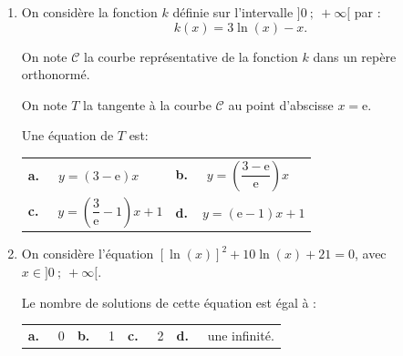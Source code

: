 \documentclass[10pt]{article}
\begin{document}
\begin{enumerate}
\begin{center}
\begin{tabularx}{\linewidth}{*{2}{X}}
en $x = 3,5$.
\end{tabularx}
\end{center}

\item On considère la fonction $k$ définie sur l'intervalle $]0~;~ +\infty[$ par :
\[k(x) = 3 \ln (x) - x.\]

On note $\mathcal{C}$ la courbe représentative de la fonction $k$ dans un repère orthonormé.

On note $T$ la tangente à la courbe $\mathcal{C}$ au point d'abscisse $x = \text{e}$.

Une équation de $T$ est:

\begin{center}
\begin{tabularx}{\linewidth}{*{2}{X}}
\textbf{a.~~} $y = (3 - \text{e})x$&\textbf{b.~~} $y = \left(\dfrac{3 - \text{e}}{\text{e}}\right)x$\\
\textbf{c.~~} $y = \left(\dfrac{3}{\text{e} }- 1\right)x + 1$&\textbf{d.~~}$y = (\text{e} - 1)x + 1$
\end{tabularx}
\end{center}
\item On considère l'équation $[\ln (x)]^2 + 10 \ln (x) + 21 = 0$, avec $x \in ]0~;~+\infty[$.

Le nombre de solutions de cette équation est égal à :
\begin{center}
\begin{tabularx}{\linewidth}{*{4}{X}}
\textbf{a.~~} 0&\textbf{b.~~} 1&\textbf{c.~~} 2&\textbf{d.~~} une infinité.
\end{tabularx}
\end{center}
\end{enumerate}
\end{document}
